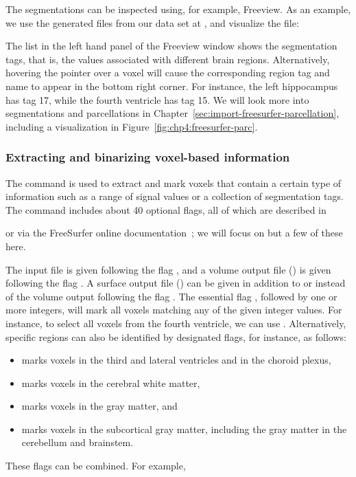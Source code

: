 The segmentations can be inspected using, for example, Freeview. As an
example, we use the \freesurfer{} generated files from our data set at
, and visualize the  file:

\noindent The list in the left hand panel of the Freeview window shows
the segmentation tags, that is, the values associated with different brain
regions. Alternatively, hovering the pointer over a voxel will
cause the corresponding region tag and name to appear in the bottom
right corner. For instance, the left hippocampus has tag 17, while the
fourth ventricle has tag 15. We will look more into segmentations and
parcellations in Chapter~\ref{sec:import-freesurfer-parcellation},
including a visualization in Figure~\ref{fig:chp4:freesurfer-parc}.

\subsubsection*{Extracting and binarizing voxel-based information}
The {\freesurfer} command  is used to extract and
mark voxels that contain a certain type of information such as a range
of signal values or a collection of segmentation tags. The command
includes about 40 optional flags, all of which are described in

\noindent or via the FreeSurfer online
documentation~\cite{freesurfer-wiki}; we will focus on but a few of
these here.

The input file is given following the flag , and a volume
output file () is given following the flag . A
surface output file () can be given in addition to or
instead of the volume output following the flag . The
essential flag , followed by one or more integers, will mark
all voxels matching any of the given integer values. For instance, to
select all voxels from the fourth ventricle, we can use . Alternatively, specific regions can also be identified by
designated flags, for instance, as follows:
\begin{itemize}
\item {} marks voxels in the third and lateral ventricles and in the choroid plexus,
\item {} marks voxels in the cerebral white matter,
\item {} marks voxels in the gray matter, and  
\item {} marks voxels in the subcortical gray matter, including the gray matter in the cerebellum and brainstem.  
\end{itemize}
These flags can be combined. For example,

